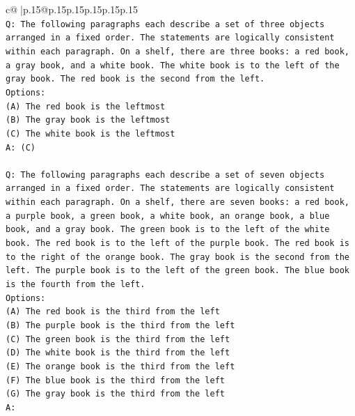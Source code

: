 \documentclass{article}
\begin{document}
{\begin{supertabular}{c@{$\;$}|p{.15\linewidth}@{}p{.15\linewidth}p{.15\linewidth}p{.15\linewidth}p{.15\linewidth}p{.15\linewidth}}
{{{\\ 
\texttt{Q: The following paragraphs each describe a set of three objects arranged in a fixed order. The statements are logically consistent within each paragraph. On a shelf, there are three books: a red book, a gray book, and a white book. The white book is to the left of the gray book. The red book is the second from the left.} \\
\texttt{Options:} \\
\texttt{(A) The red book is the leftmost} \\
\texttt{(B) The gray book is the leftmost} \\
\texttt{(C) The white book is the leftmost} \\
\texttt{A: (C)} \\
\\ 
\texttt{Q: The following paragraphs each describe a set of seven objects arranged in a fixed order. The statements are logically consistent within each paragraph. On a shelf, there are seven books: a red book, a purple book, a green book, a white book, an orange book, a blue book, and a gray book. The green book is to the left of the white book. The red book is to the left of the purple book. The red book is to the right of the orange book. The gray book is the second from the left. The purple book is to the left of the green book. The blue book is the fourth from the left.} \\
\texttt{Options:} \\
\texttt{(A) The red book is the third from the left} \\
\texttt{(B) The purple book is the third from the left} \\
\texttt{(C) The green book is the third from the left} \\
\texttt{(D) The white book is the third from the left} \\
\texttt{(E) The orange book is the third from the left} \\
\texttt{(F) The blue book is the third from the left} \\
\texttt{(G) The gray book is the third from the left} \\
\texttt{A:} \\
            }
        }
    }
     \\ \\


\end{supertabular}}
\end{document}
